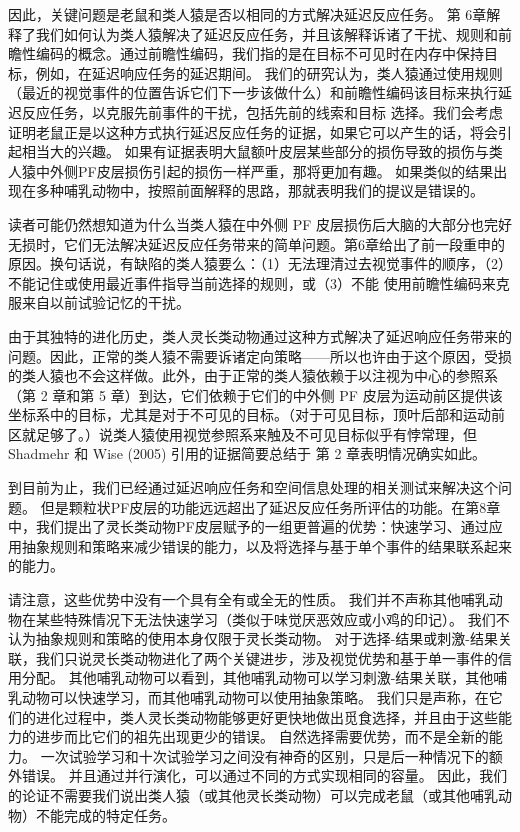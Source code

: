 \par 
因此，关键问题是老鼠和类人猿是否以相同的方式解决延迟反应任务。 第 6章解释了我们如何认为类人猿解决了延迟反应任务，并且该解释诉诸了干扰、规则和前瞻性编码的概念。通过前瞻性编码，我们指的是在目标不可见时在内存中保持目标，例如，在延迟响应任务的延迟期间。 我们的研究认为，类人猿通过使用规则（最近的视觉事件的位置告诉它们下一步该做什么）和前瞻性编码该目标来执行延迟反应任务，以克服先前事件的干扰，包括先前的线索和目标 选择。我们会考虑证明老鼠正是以这种方式执行延迟反应任务的证据，如果它可以产生的话，将会引起相当大的兴趣。 如果有证据表明大鼠额叶皮层某些部分的损伤导致的损伤与类人猿中外侧PF皮层损伤引起的损伤一样严重，那将更加有趣。 如果类似的结果出现在多种哺乳动物中，按照前面解释的思路，那就表明我们的提议是错误的。
\par 
读者可能仍然想知道为什么当类人猿在中外侧 PF 皮层损伤后大脑的大部分也完好无损时，它们无法解决延迟反应任务带来的简单问题。第6章给出了前一段重申的原因。换句话说，有缺陷的类人猿要么：（1）无法理清过去视觉事件的顺序，（2）不能记住或使用最近事件指导当前选择的规则，或（3）不能 使用前瞻性编码来克服来自以前试验记忆的干扰。
\par 
由于其独特的进化历史，类人灵长类动物通过这种方式解决了延迟响应任务带来的问题。因此，正常的类人猿不需要诉诸定向策略——所以也许由于这个原因，受损的类人猿也不会这样做。此外，由于正常的类人猿依赖于以注视为中心的参照系（第 2 章和第 5 章）到达，它们依赖于它们的中外侧 PF 皮层为运动前区提供该坐标系中的目标，尤其是对于不可见的目标。（对于可见目标，顶叶后部和运动前区就足够了。）说类人猿使用视觉参照系来触及不可见目标似乎有悖常理，但 Shadmehr 和 Wise (2005) 引用的证据简要总结于 第 2 章表明情况确实如此。
\par 
到目前为止，我们已经通过延迟响应任务和空间信息处理的相关测试来解决这个问题。 但是颗粒状PF皮层的功能远远超出了延迟反应任务所评估的功能。在第8章中，我们提出了灵长类动物PF皮层赋予的一组更普遍的优势：快速学习、通过应用抽象规则和策略来减少错误的能力，以及将选择与基于单个事件的结果联系起来的能力。
\par 
请注意，这些优势中没有一个具有全有或全无的性质。 我们并不声称其他哺乳动物在某些特殊情况下无法快速学习（类似于味觉厌恶效应或小鸡的印记）。 我们不认为抽象规则和策略的使用本身仅限于灵长类动物。 对于选择-结果或刺激-结果关联，我们只说灵长类动物进化了两个关键进步，涉及视觉优势和基于单一事件的信用分配。 其他哺乳动物可以看到，其他哺乳动物可以学习刺激-结果关联，其他哺乳动物可以快速学习，而其他哺乳动物可以使用抽象策略。 我们只是声称，在它们的进化过程中，类人灵长类动物能够更好更快地做出觅食选择，并且由于这些能力的进步而比它们的祖先出现更少的错误。 自然选择需要优势，而不是全新的能力。 一次试验学习和十次试验学习之间没有神奇的区别，只是后一种情况下的额外错误。 并且通过并行演化，可以通过不同的方式实现相同的容量。 因此，我们的论证不需要我们说出类人猿（或其他灵长类动物）可以完成老鼠（或其他哺乳动物）不能完成的特定任务。
